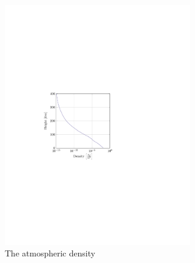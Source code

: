 \begin{figure}[ht!]
	\centering
	\begin{subfigure}{0.45\textwidth}
	\centering
	\includegraphics[trim={4cm 9.8cm 9cm 10cm},clip,width=0.9\textwidth]{Figure/atmos_model/density.pdf}
	\caption{The atmospheric density} 
	\label{fig:atmos_height_rho}
	\end{subfigure}
	\begin{subfigure}{0.45\textwidth}
	\centering

\end{subfigure}
\end{figure}
